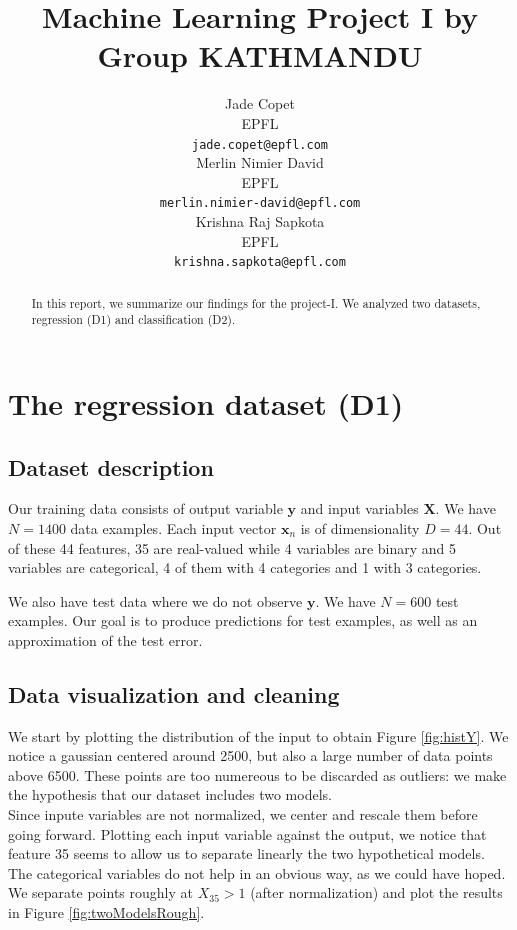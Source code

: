 \documentclass{article} %
\title{Machine Learning Project I by Group KATHMANDU}
\author{
Jade Copet\\
EPFL \\
\texttt{jade.copet@epfl.com} \\
\And
Merlin Nimier David\\
EPFL \\
\texttt{merlin.nimier-david@epfl.com} \\
\And
Krishna Raj Sapkota\\
EPFL \\
\texttt{krishna.sapkota@epfl.com} \\
}
\begin{document}
\maketitle



\begin{abstract}
  In this report, we summarize our findings for the project-I. We analyzed two datasets, regression (D1) and classification (D2).
\end{abstract}



\section{The regression dataset (D1)}

  \subsection{Dataset description}
  Our training data consists of output variable $\mathbf{y}$ and input variables $\mathbf{X}$. We have $N = 1400$ data examples. Each input vector $\mathbf{x}_n$ is of dimensionality $D = 44$. Out of these 44 features, 35 are real-valued while 4 variables are binary and 5 variables are categorical, 4 of them with 4 categories and 1 with 3 categories.

  We also have test data where we do not observe $\mathbf{y}$. We have $N = 600$ test examples. Our goal is to produce predictions for test examples, as well as an approximation of the test error.

  \subsection{Data visualization and cleaning}
  We start by plotting the distribution of the input to obtain Figure \ref{fig:histY}. We notice a gaussian centered around 2500, but also a large number of data points above 6500. These points are too numereous to be discarded as outliers: we make the hypothesis that our dataset includes two models.\\

  Since inpute variables are not normalized, we center and rescale them before going forward. Plotting each input variable against the output, we notice that feature 35 seems to allow us to separate linearly the two hypothetical models. The categorical variables do not help in an obvious way, as we could have hoped. We separate points roughly at $X_{35} > 1$ (after normalization) and plot the results in Figure \ref{fig:twoModelsRough}.
\end{document}
